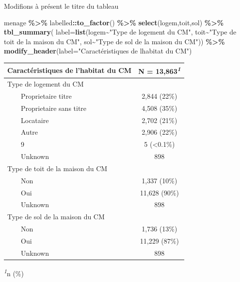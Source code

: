 \documentclass[
]{article}
\newenvironment{Shaded}{\begin{snugshade}}{\end{snugshade}}
\newcommand{\AttributeTok}[1]{\textcolor[rgb]{0.13,0.29,0.53}{#1}}
\newcommand{\FunctionTok}[1]{\textcolor[rgb]{0.13,0.29,0.53}{\textbf{#1}}}
\newcommand{\NormalTok}[1]{#1}
\newcommand{\SpecialCharTok}[1]{\textcolor[rgb]{0.81,0.36,0.00}{\textbf{#1}}}
\newcommand{\StringTok}[1]{\textcolor[rgb]{0.31,0.60,0.02}{#1}}
\begin{document}
\newpage

Modifions à présent le titre du tableau

\begin{Shaded}
\begin{Highlighting}[]
\NormalTok{menage }\SpecialCharTok{\%\textgreater{}\%}\NormalTok{ labelled}\SpecialCharTok{::}\FunctionTok{to\_factor}\NormalTok{() }\SpecialCharTok{\%\textgreater{}\%}
  \FunctionTok{select}\NormalTok{(logem,toit,sol) }\SpecialCharTok{\%\textgreater{}\%}
  \FunctionTok{tbl\_summary}\NormalTok{(}
    \AttributeTok{label=}\FunctionTok{list}\NormalTok{(logem}\SpecialCharTok{\textasciitilde{}}\StringTok{"Type de logement du CM"}\NormalTok{,}
\NormalTok{               toit}\SpecialCharTok{\textasciitilde{}}\StringTok{"Type de toit de la maison du CM"}\NormalTok{,}
\NormalTok{               sol}\SpecialCharTok{\textasciitilde{}}\StringTok{"Type de sol de la maison du CM"}\NormalTok{)) }\SpecialCharTok{\%\textgreater{}\%}
  \FunctionTok{modify\_header}\NormalTok{(}\AttributeTok{label=}\StringTok{"Caractéristiques de l\textquotesingle{}habitat du CM"}\NormalTok{)}
\end{Highlighting}
\end{Shaded}

\begin{table}[!t]
\fontsize{12.0pt}{14.4pt}\selectfont
\begin{tabular*}{\linewidth}{@{\extracolsep{\fill}}lc}
\toprule
Caractéristiques de l'habitat du CM & \textbf{N = 13,863}\textsuperscript{\textit{1}} \\ 
\midrule\addlinespace[2.5pt]
Type de logement du CM &  \\ 
    Proprietaire titre & 2,844 (22\%) \\ 
    Proprietaire sans titre & 4,508 (35\%) \\ 
    Locataire & 2,702 (21\%) \\ 
    Autre & 2,906 (22\%) \\ 
    9 & 5 (<0.1\%) \\ 
    Unknown & 898 \\ 
Type de toit de la maison du CM &  \\ 
    Non & 1,337 (10\%) \\ 
    Oui & 11,628 (90\%) \\ 
    Unknown & 898 \\ 
Type de sol de la maison du CM &  \\ 
    Non & 1,736 (13\%) \\ 
    Oui & 11,229 (87\%) \\ 
    Unknown & 898 \\ 
\bottomrule
\end{tabular*}
\begin{minipage}{\linewidth}
\textsuperscript{\textit{1}}n (\%)\\
\end{minipage}
\end{table}
\end{document}
